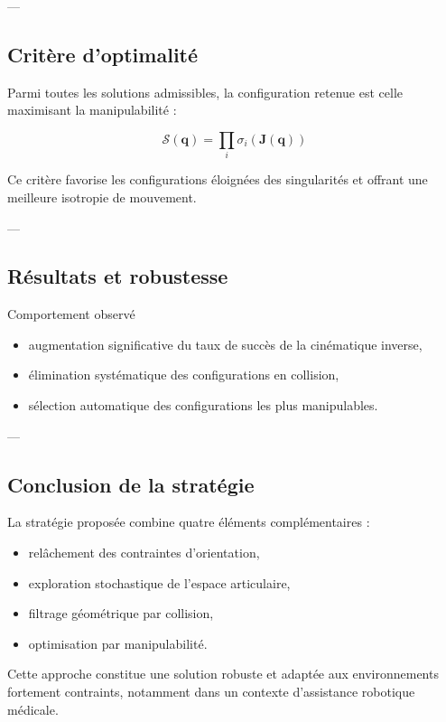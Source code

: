 \documentclass[11pt, a4paper]{article}
\begin{document}
---

\subsection{Critère d’optimalité}

Parmi toutes les solutions admissibles, la configuration retenue est celle maximisant la manipulabilité :

\begin{equation}
\mathcal{S}(\mathbf{q}) = \prod_{i} \sigma_i(\mathbf{J}(\mathbf{q}))
\end{equation}

Ce critère favorise les configurations éloignées des singularités et offrant une meilleure isotropie de mouvement.

---

\subsection{Résultats et robustesse}

\begin{resultbox}{Comportement observé}
\begin{itemize}
  \item augmentation significative du taux de succès de la cinématique inverse,
  \item élimination systématique des configurations en collision,
  \item sélection automatique des configurations les plus manipulables.
\end{itemize}
\end{resultbox}

---

\subsection{Conclusion de la stratégie}

La stratégie proposée combine quatre éléments complémentaires :
\begin{itemize}
  \item relâchement des contraintes d’orientation,
  \item exploration stochastique de l’espace articulaire,
  \item filtrage géométrique par collision,
  \item optimisation par manipulabilité.
\end{itemize}

Cette approche constitue une solution robuste et adaptée aux environnements fortement contraints, notamment dans un contexte d’assistance robotique médicale.
\end{document}
